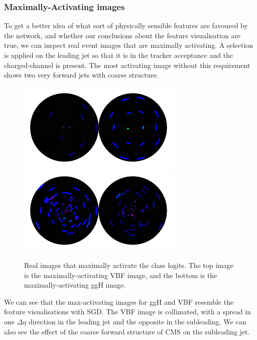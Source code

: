 \subsubsection{Maximally-Activating images}
To get a better idea of what sort of physically sensible features are favoured by the network, and whether our conclusions about the feature visualisation are true, we can inspect real event images that are maximally activating. 
A selection is applied on the leading jet so that it is in the tracker acceptance and the charged-\pt  channel is present. The most activating image without this requirement shows two very forward jets with coarse structure.
\begin{figure}[h!]
    \includegraphics[width=0.7\textwidth]{figures/event_selection/max_img_vbf_tkr_cut_logits_normtype1.pdf}
    \includegraphics[width=0.7\textwidth]{figures/event_selection/max_img_ggh_tkr_cut_logits_normtype1.pdf}
    \caption{Real images that maximally activate the class logits. 
             The top image is the maximally-activating VBF image, and the bottom is the maximally-activating ggH image. }
    \label{fig:event_categorisation:maxact_vis_vbf_ggh}
\end{figure}

We can see that the max-activating images for ggH and VBF resemble the feature visualisations with SGD. 
The VBF image is collimated, with a spread in one $\Delta\eta$ direction in the leading jet and the opposite in the subleading. We can also see the effect of the coarse forward structure of CMS on the subleading jet. 

